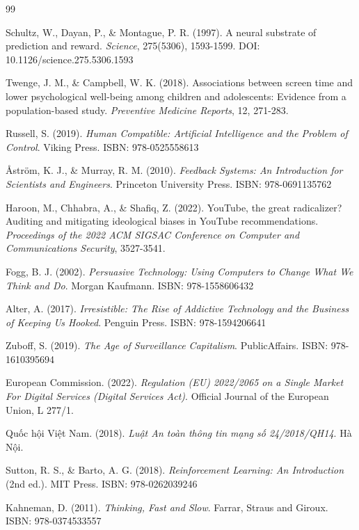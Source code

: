 \begin{thebibliography}{99}

Schultz, W., Dayan, P., \& Montague, P. R. (1997). A neural substrate of prediction and reward. \textit{Science}, 275(5306), 1593-1599. DOI: 10.1126/science.275.5306.1593

Twenge, J. M., \& Campbell, W. K. (2018). Associations between screen time and lower psychological well-being among children and adolescents: Evidence from a population-based study. \textit{Preventive Medicine Reports}, 12, 271-283.

Russell, S. (2019). \textit{Human Compatible: Artificial Intelligence and the Problem of Control}. Viking Press. ISBN: 978-0525558613

Åström, K. J., \& Murray, R. M. (2010). \textit{Feedback Systems: An Introduction for Scientists and Engineers}. Princeton University Press. ISBN: 978-0691135762

Haroon, M., Chhabra, A., \& Shafiq, Z. (2022). YouTube, the great radicalizer? Auditing and mitigating ideological biases in YouTube recommendations. \textit{Proceedings of the 2022 ACM SIGSAC Conference on Computer and Communications Security}, 3527-3541.

Fogg, B. J. (2002). \textit{Persuasive Technology: Using Computers to Change What We Think and Do}. Morgan Kaufmann. ISBN: 978-1558606432

Alter, A. (2017). \textit{Irresistible: The Rise of Addictive Technology and the Business of Keeping Us Hooked}. Penguin Press. ISBN: 978-1594206641

Zuboff, S. (2019). \textit{The Age of Surveillance Capitalism}. PublicAffairs. ISBN: 978-1610395694

European Commission. (2022). \textit{Regulation (EU) 2022/2065 on a Single Market For Digital Services (Digital Services Act)}. Official Journal of the European Union, L 277/1.

Quốc hội Việt Nam. (2018). \textit{Luật An toàn thông tin mạng số 24/2018/QH14}. Hà Nội.

Sutton, R. S., \& Barto, A. G. (2018). \textit{Reinforcement Learning: An Introduction} (2nd ed.). MIT Press. ISBN: 978-0262039246

Kahneman, D. (2011). \textit{Thinking, Fast and Slow}. Farrar, Straus and Giroux. ISBN: 978-0374533557


\end{thebibliography}
